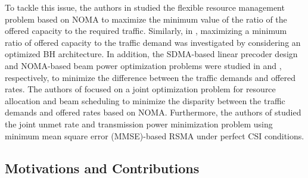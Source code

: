 \documentclass[draftclsnofoot, onecolumn, comsoc, 12pt]{IEEEtran}
\begin{document}
{To tackle this issue, the authors in \cite{wang2020noma} studied the flexible resource management problem based on NOMA to maximize the minimum value of the ratio of the offered capacity to the required traffic.}
{Similarly, in \cite{lin2022multi}, maximizing a minimum ratio of offered capacity to the traffic demand was investigated by considering an optimized BH architecture.} 
{In addition, the SDMA-based linear precoder design and NOMA-based beam power optimization problems were studied in \cite{zheng2012generic} and \cite{liu2019qos}, respectively, to minimize the difference between the traffic demands and offered rates.}
{The authors of \cite{9769901} 
focused on a joint optimization problem for resource allocation and beam scheduling to minimize the disparity between the traffic demands and offered rates based on NOMA.}
{Furthermore, the authors of \cite{cui2023energy} studied the joint {unmet rate} and transmission power minimization problem using minimum mean square error (MMSE)-based RSMA under perfect CSI conditions.} 


{\subsection{Motivations and Contributions}}
\end{document}
